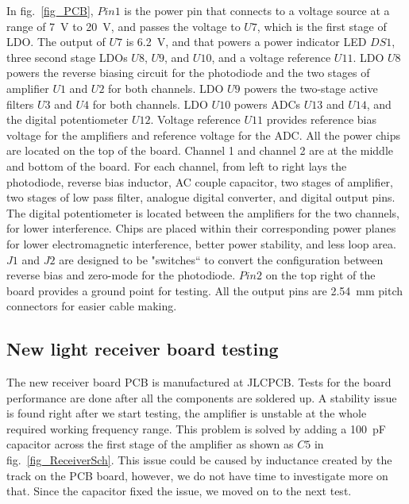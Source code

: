 In fig.~\ref{fig_PCB}, $Pin1$ is the power pin that connects to a voltage source at a range of \qty{7}{V} to \qty{20}{V}, and passes the voltage to $U7$, which is the first stage of LDO.  The output of $U7$ is \qty{6.2}{V}, and that powers a power indicator LED $DS1$, three second stage LDOs $U8$, $U9$, and $U10$, and a voltage reference $U11$.  LDO $U8$ powers the reverse biasing circuit for the photodiode and the two stages of amplifier $U1$ and $U2$ for both channels.  LDO $U9$ powers the two-stage active filters $U3$ and $U4$ for both channels.  LDO $U10$ powers ADCs $U13$ and $U14$, and the digital potentiometer $U12$.  Voltage reference $U11$ provides reference bias voltage for the amplifiers and reference voltage for the ADC.  All the power chips are located on the top of the board.  Channel 1 and channel 2 are at the middle and bottom of the board.  For each channel, from left to right lays the photodiode, reverse bias inductor, AC couple capacitor, two stages of amplifier, two stages of low pass filter, analogue digital converter, and digital output pins.  The digital potentiometer is located between the amplifiers for the two channels, for lower interference.  Chips are placed within their corresponding power planes for lower electromagnetic interference, better power stability, and less loop area.  $J1$ and $J2$ are designed to be "switches`` to convert the configuration between reverse bias and zero-mode for the photodiode.  $Pin2$ on the top right of the board provides a ground point for testing.  All the output pins are \qty{2.54}{mm} pitch connectors for easier cable making.


\subsection{New light receiver board testing}

The new receiver board PCB is manufactured at JLCPCB.  Tests for the board performance are done after all the components are soldered up.  A stability issue is found right after we start testing, the amplifier is unstable at the whole required working frequency range.   This problem is solved by adding a \qty{100}{pF} capacitor across the first stage of the amplifier as shown as $C5$ in fig.~\ref{fig_ReceiverSch}.  This issue could be caused by inductance created by the track on the PCB board, however, we do not have time to investigate more on that.  Since the capacitor fixed the issue, we moved on to the next test.

